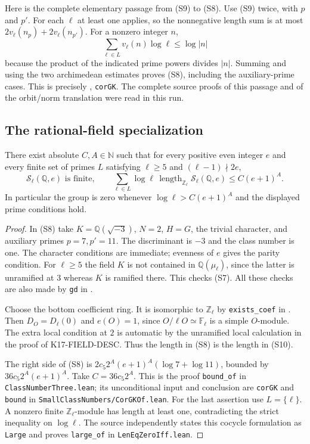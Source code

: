 Here is the complete elementary passage from (S9) to (S8).
Use (S9) twice, with $p$ and $p'$. For each $\ell$ at least one applies,
so the nonnegative length sum is at most
$2v_\ell(n_p)+2v_\ell(n_{p'})$. For a nonzero integer $n$,
\[
 \sum_{\ell\in L}v_\ell(n)\log\ell\le\log|n|
\]
because the product of the indicated prime powers divides $|n|$.
Summing and using the two archimedean estimates proves (S8), including
the auxiliary-prime cases. This is precisely
, \texttt{corGK}.
The complete source proofs of this passage and of the orbit/norm
translation were read in this run.

\subsection{The rational-field specialization}

\begin{theorem}[K17-S17-Q]
There exist absolute $C,A\in\mathbb N$ such that for every positive even
integer $e$ and every finite set of primes $L$ satisfying
$\ell\ge5$ and $(\ell-1)\nmid2e$,
\[
 \mathcal S_\ell(\mathbb Q,e)\text{ is finite},\qquad
 \sum_{\ell\in L}\log\ell\,
   \operatorname{length}_{\mathbb Z_\ell}\mathcal S_\ell(\mathbb Q,e)
 \le C(e+1)^A. \tag{S10}
\]
In particular the group is zero whenever $\log\ell>C(e+1)^A$
and the displayed prime conditions hold.
\end{theorem}
\begin{proof}
In (S8) take $K=\mathbb Q(\sqrt{-3})$, $N=2$, $H=G$, the trivial
character, and auxiliary primes $p=7,p'=11$. The discriminant is $-3$
and the class number is one. The character conditions are immediate;
evenness of $e$ gives the parity condition. For $\ell\ge5$ the field
$K$ is not contained in $\mathbb Q(\mu_\ell)$, since the latter is
unramified at $3$ whereas $K$ is ramified there. This checks (S7).
All these checks are also made by \texttt{gd} in
.

Choose the bottom coefficient ring. It is isomorphic to
$\mathbb Z_\ell$ by \texttt{exists\_coef} in
. Then $D_O=D_\ell(0)$
and $e(O)=1$, since $O/\ell O\simeq\mathbb F_\ell$ is a simple
$O$-module. The extra local condition at $2$ is automatic by the
unramified local calculation in the proof of K17-FIELD-DESC.
Thus the length in (S8) is the length in (S10).

The right side of (S8) is
$2c_5 2^A(e+1)^A(\log7+\log11)$, bounded by
$36c_5 2^A(e+1)^A$. Take $C=36c_5 2^A$.
This is the proof \texttt{bound\_of} in
\texttt{ClassNumberThree.lean}; its unconditional input and conclusion
are \texttt{corGK} and \texttt{bound} in
\texttt{SmallClassNumbers/CorGKOf.lean}.
For the last assertion use $L=\{\ell\}$. A nonzero finite
$\mathbb Z_\ell$-module has length at least one, contradicting
the strict inequality on $\log\ell$. The source independently states
this cocycle formulation as \texttt{Large} and proves
\texttt{large\_of} in \texttt{LenEqZeroIff.lean}.
\end{proof}

